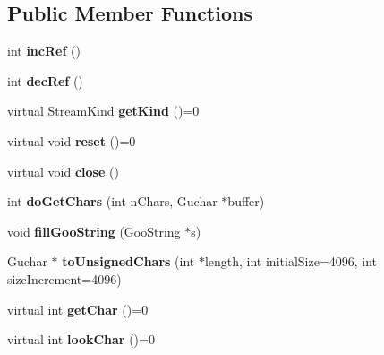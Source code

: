 \subsection*{Public Member Functions}
\begin{DoxyCompactItemize}
\item 
\mbox{\label{class_stream_a72ded73f74dbc96b4961c3e1675431ff}} 
int {\bfseries inc\+Ref} ()
\item 
\mbox{\label{class_stream_aa3656cdd123c716adbd9526523439091}} 
int {\bfseries dec\+Ref} ()
\item 
\mbox{\label{class_stream_a84aecd570b480015e251c89a2afcfce5}} 
virtual Stream\+Kind {\bfseries get\+Kind} ()=0
\item 
\mbox{\label{class_stream_a8246d1b555eba25b9f95815386b5489b}} 
virtual void {\bfseries reset} ()=0
\item 
\mbox{\label{class_stream_af5c69562d890aa81c8c8e24280bfa9e0}} 
virtual void {\bfseries close} ()
\item 
\mbox{\label{class_stream_ace312cf6e38c9420c3af18c707ecc38b}} 
int {\bfseries do\+Get\+Chars} (int n\+Chars, Guchar $\ast$buffer)
\item 
\mbox{\label{class_stream_a3ca4d7a5de26df523732a8a999afbfc3}} 
void {\bfseries fill\+Goo\+String} (\hyperlink{class_goo_string}{Goo\+String} $\ast$s)
\item 
\mbox{\label{class_stream_a0868030abb4d42d49bddf6b9170802b0}} 
Guchar $\ast$ {\bfseries to\+Unsigned\+Chars} (int $\ast$length, int initial\+Size=4096, int size\+Increment=4096)
\item 
\mbox{\label{class_stream_ad8a0c56244d3d2077c56a8222ee39250}} 
virtual int {\bfseries get\+Char} ()=0
\item 
\mbox{\label{class_stream_a7b5b42a77e3bb0cf12cb5c9e723dceac}} 
virtual int {\bfseries look\+Char} ()=0
\item 
\mbox{\label{class_stream_a97b7674e633860ecbb09cc8cf15a1ffa}} 

\end{DoxyCompactItemize}
